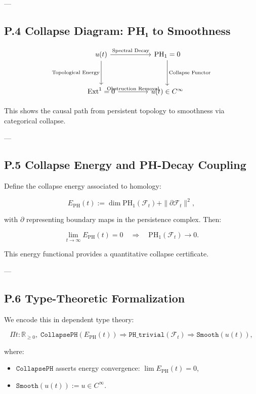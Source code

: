 \documentclass[11pt]{article}
\begin{document}
---

\subsection*{P.4 Collapse Diagram: PH₁ to Smoothness}

\[
\begin{tikzcd}[column sep=1.5cm, row sep=1.2cm]
u(t) \arrow[r, "\text{Spectral Decay}"] \arrow[d, swap, "\text{Topological Energy}"]
& \mathrm{PH}_1 = 0 \arrow[d, "\text{Collapse Functor}"] \\
\mathrm{Ext}^1 = 0 \arrow[r, "\text{Obstruction Removal}"]
& u(t) \in C^\infty
\end{tikzcd}
\]

This shows the causal path from persistent topology to smoothness via categorical collapse.

---

\subsection*{P.5 Collapse Energy and PH-Decay Coupling}

Define the collapse energy associated to homology:

\[
E_{\mathrm{PH}}(t) := \dim \mathrm{PH}_1(\mathcal{F}_t) + \|\partial \mathcal{F}_t\|^2,
\]

with $\partial$ representing boundary maps in the persistence complex. Then:

\[
\lim_{t \to \infty} E_{\mathrm{PH}}(t) = 0 \quad \Rightarrow \quad \mathrm{PH}_1(\mathcal{F}_t) \to 0.
\]

This energy functional provides a quantitative collapse certificate.

---

\subsection*{P.6 Type-Theoretic Formalization}

We encode this in dependent type theory:

\[
\Pi t : \mathbb{R}_{\ge 0},\;
\texttt{CollapsePH}(E_{\mathrm{PH}}(t)) \Rightarrow
\texttt{PH\_trivial}(\mathcal{F}_t) \Rightarrow
\texttt{Smooth}(u(t)),
\]

where:
\begin{itemize}
  \item $\texttt{CollapsePH}$ asserts energy convergence: $\lim E_{\mathrm{PH}}(t) = 0$,
  \item $\texttt{Smooth}(u(t)) := u \in C^\infty$.
\end{itemize}
\end{document}
